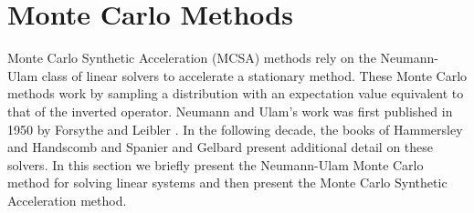 \documentclass{snamc2013}
\begin{document}
\section{Monte Carlo Methods}
Monte Carlo Synthetic Acceleration (MCSA) methods rely on the
Neumann-Ulam class of linear solvers to accelerate a stationary
method. These Monte Carlo methods work by sampling a distribution with
an expectation value equivalent to that of the inverted
operator. Neumann and Ulam's work was first published in 1950 by
Forsythe and Leibler \cite{forsythe_matrix_1950}. In the following
decade, the books of Hammersley and Handscomb
\cite{hammersley_monte_1964} and Spanier and Gelbard
\cite{spanier_monte_1969} present additional detail on these solvers.
In this section we briefly present the Neumann-Ulam Monte Carlo method
for solving linear systems and then present the Monte Carlo Synthetic
Acceleration method.
\end{document}
